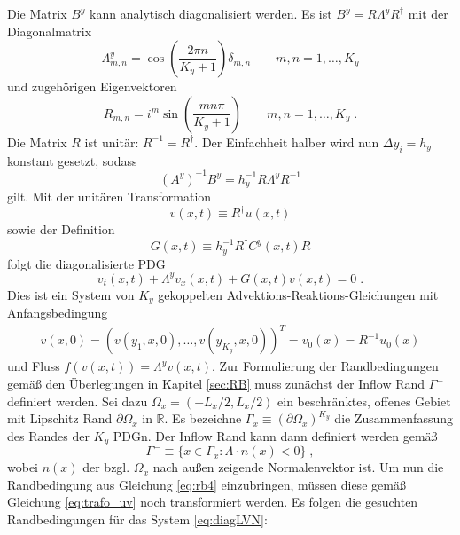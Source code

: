 Die Matrix $B^y$ kann analytisch diagonalisiert werden. Es ist ${B^y = R\Lambda^y R^{\dagger}}$ mit der Diagonalmatrix
\begin{equation}
  \Lambda^y_{m,n} = \cos\left(\frac{2\pi n}{K_y+1}\right)\delta_{m,n}   \qquad m,n = 1,\dots,K_y
  \label{eq:Lambda}
\end{equation}
und zugehörigen Eigenvektoren
\begin{equation}
  R_{m,n} = i^m \sin\left(\frac{mn\pi}{K_y +1} \right)   \qquad m,n = 1,\dots,K_y \; .
\end{equation}
Die Matrix $R$ ist unitär: $R^{-1} = R^{\dagger}$. Der Einfachheit halber wird nun $\Delta y_i = h_y$ konstant gesetzt, sodass
\begin{equation}
  (A^y)^{-1}B^y = h_y^{-1}R\Lambda^y R^{-1}
\end{equation}
gilt. Mit der unitären Transformation
\begin{equation}
  v(x,t) \equiv R^{\dagger}u(x,t) \label{eq:trafo_uv}
\end{equation}
sowie der Definition
\begin{equation}
  G(x,t) \equiv h_y^{-1} R^{\dagger}C^y(x,t)R
  \label{eq:G}
\end{equation}
folgt die diagonalisierte PDG
\begin{equation}
  v_t(x,t) + \Lambda^y v_x(x,t) + G(x,t)v(x,t) = 0 \; .
  \label{eq:diagLVN}
\end{equation}
Dies ist ein System von $K_y$ gekoppelten Advektions-Reaktions-Gleichungen mit Anfangsbedingung
\begin{align}
  v(x,0) = (v(y_1,x,0),\dots,v(y_{K_y},x,0))^T = {v}_0(x) = R^{-1}u_0(x)
\end{align}
und Fluss ${{f}({v}(x,t))=\Lambda^y {v}(x,t)}$. Zur Formulierung der Randbedingungen gemäß den Überlegungen in Kapitel \ref{sec:RB} muss zunächst der Inflow Rand $\Gamma^-$ definiert werden.
Sei dazu ${\Omega_x = (-L_x/2,L_x/2)}$ ein beschränktes, offenes Gebiet mit Lipschitz Rand $\partial\Omega_x$ in  $\mathbb{R}$. Es bezeichne $\Gamma_x\equiv (\partial\Omega_x)^{K_y}$ die Zusammenfassung des Randes der $K_y$ PDGn. Der Inflow Rand kann dann definiert werden gemäß
\begin{equation}
  \Gamma^- \equiv \{x\in\Gamma_x : \Lambda \cdot n(x) < 0\} \; ,
\end{equation}
wobei $n(x)$ der bzgl. $\Omega_x$ nach außen zeigende Normalenvektor ist. Um nun die Randbedingung aus Gleichung \eqref{eq:rb4} einzubringen, müssen diese gemäß Gleichung \eqref{eq:trafo_uv} noch transformiert werden. Es folgen die gesuchten Randbedingungen für das System \eqref{eq:diagLVN}:
